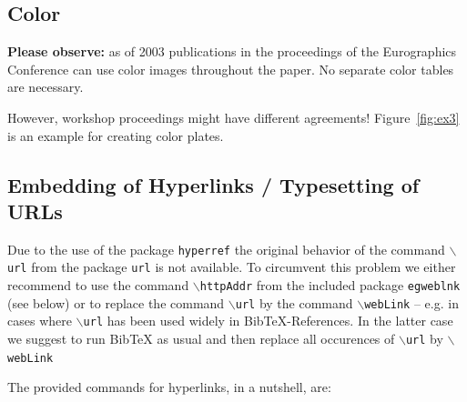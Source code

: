 \documentclass{egpubl}
\begin{document}
	
	\subsection{Color}
	
	\textbf{Please observe:} as of 2003 publications in the proceedings of the
	Eurographics Conference can use color images throughout the paper. No
	separate color tables are necessary.
	
	However, workshop proceedings might have different agreements! 
	Figure~\ref{fig:ex3} is an example for creating color plates.
	
	\subsection{Embedding of Hyperlinks / Typesetting of URLs}
	
	Due to the use of the package \texttt{hyperref} the original behavior
	of the command $\backslash$\texttt{url} from the package \texttt{url}
	is not available. To circumvent this problem we either recommend to
	use the command $\backslash$\texttt{httpAddr} from the 
	included package \texttt{egweblnk} (see below) or to replace the
	command $\backslash$\texttt{url} by the command $\backslash$\texttt{webLink} 
	-- e.g. in cases where $\backslash$\texttt{url} has been used
	widely in BibTeX-References. In the latter case we suggest to run
	BibTeX as usual and then replace all occurences of $\backslash$\texttt{url}  by
	$\backslash$\texttt{webLink}
	
	\noindent
	The provided commands for hyperlinks, in a nutshell, are:
	
\end{document}
